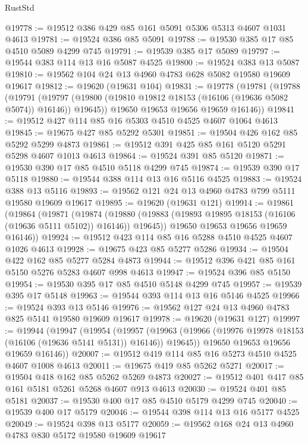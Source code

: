 \begin{lexlean}{RustStd}
\begin{coremodule}
@19778 := @19512 @386 @429 @85 @161 @5091 @5306 @5313 @4607 @1031 @4613
@19781 := @19524 @386 @85 @5091
@19788 := @19530 @385 @17 @85 @4510 @5089 @4299 @745
@19791 := @19539 @385 @17 @5089
@19797 := @19544 @383 @114 @13 @16 @5087 @4525
@19800 := @19524 @383 @13 @5087
@19810 := @19562 @104 @24 @13 @4960 @4783 @628 @5082 @19580 @19609 @19617
@19812 := @19620 (@19631 @104)
@19831 := @19778
    (@19781
      (@19788
        (@19791
          (@19797 (@19800 (@19810 @19812 @18153 (@16106 (@19636 @5082 @5074)) @16146)) @19645))
        @19650
        @19653
        @19656
        @19659
        @16146))
@19841 := @19512 @427 @114 @85 @16 @5303 @4510 @4525 @4607 @1064 @4613
@19845 := @19675 @427 @85 @5292 @5301
@19851 := @19504 @426 @162 @85 @5292 @5299 @4873
@19861 := @19512 @391 @425 @85 @161 @5120 @5291 @5298 @4607 @1013 @4613
@19864 := @19524 @391 @85 @5120
@19871 := @19530 @390 @17 @85 @4510 @5118 @4299 @745
@19874 := @19539 @390 @17 @5118
@19880 := @19544 @388 @114 @13 @16 @5116 @4525
@19883 := @19524 @388 @13 @5116
@19893 := @19562 @121 @24 @13 @4960 @4783 @799 @5111 @19580 @19609 @19617
@19895 := @19620 (@19631 @121)
@19914 := @19861
    (@19864
      (@19871
        (@19874
          (@19880 (@19883 (@19893 @19895 @18153 (@16106 (@19636 @5111 @5102)) @16146)) @19645))
        @19650
        @19653
        @19656
        @19659
        @16146))
@19924 := @19512 @423 @114 @85 @16 @5288 @4510 @4525 @4607 @1026 @4613
@19928 := @19675 @423 @85 @5277 @5286
@19934 := @19504 @422 @162 @85 @5277 @5284 @4873
@19944 := @19512 @396 @421 @85 @161 @5150 @5276 @5283 @4607 @998 @4613
@19947 := @19524 @396 @85 @5150
@19954 := @19530 @395 @17 @85 @4510 @5148 @4299 @745
@19957 := @19539 @395 @17 @5148
@19963 := @19544 @393 @114 @13 @16 @5146 @4525
@19966 := @19524 @393 @13 @5146
@19976 := @19562 @127 @24 @13 @4960 @4783 @825 @5141 @19580 @19609 @19617
@19978 := @19620 (@19631 @127)
@19997 := @19944
    (@19947
      (@19954
        (@19957
          (@19963 (@19966 (@19976 @19978 @18153 (@16106 (@19636 @5141 @5131)) @16146)) @19645))
        @19650
        @19653
        @19656
        @19659
        @16146))
@20007 := @19512 @419 @114 @85 @16 @5273 @4510 @4525 @4607 @1008 @4613
@20011 := @19675 @419 @85 @5262 @5271
@20017 := @19504 @418 @162 @85 @5262 @5269 @4873
@20027 := @19512 @401 @417 @85 @161 @5181 @5261 @5268 @4607 @913 @4613
@20030 := @19524 @401 @85 @5181
@20037 := @19530 @400 @17 @85 @4510 @5179 @4299 @745
@20040 := @19539 @400 @17 @5179
@20046 := @19544 @398 @114 @13 @16 @5177 @4525
@20049 := @19524 @398 @13 @5177
@20059 := @19562 @168 @24 @13 @4960 @4783 @830 @5172 @19580 @19609 @19617

\end{coremodule}
\end{lexlean}
